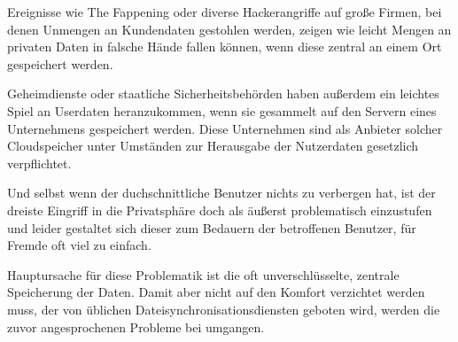Ereignisse wie \glqq{} The Fappening \grqq{} oder diverse Hackerangriffe auf große Firmen, bei
denen Unmengen an Kundendaten gestohlen werden, zeigen wie leicht Mengen an
privaten Daten in falsche Hände fallen können, wenn diese zentral an einem Ort
gespeichert werden.

Geheimdienste oder staatliche Sicherheitsbehörden haben außerdem ein leichtes
Spiel an Userdaten heranzukommen, wenn sie gesammelt auf den Servern eines
Unternehmens gespeichert werden. Diese Unternehmen sind als Anbieter solcher
Cloudspeicher unter Umständen zur Herausgabe der Nutzerdaten gesetzlich
verpflichtet.

Und selbst wenn der duchschnittliche Benutzer nichts zu verbergen hat, ist der
dreiste Eingriff in die Privatsphäre doch als äußerst problematisch einzustufen
und leider gestaltet sich dieser zum Bedauern der betroffenen Benutzer, für
Fremde oft viel zu einfach.

Hauptursache für diese Problematik ist die oft unverschlüsselte, zentrale
Speicherung der Daten. Damit aber nicht auf den Komfort verzichtet werden muss,
der von üblichen Dateisynchronisationsdiensten geboten wird, werden die zuvor
angesprochenen Probleme bei \sblit umgangen.
